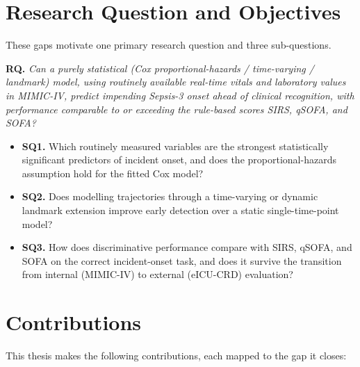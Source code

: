 \section{Research Question and Objectives}
\label{sec:rq}
These gaps motivate one primary research question and three sub-questions.

\vspace{4pt}
\noindent\textbf{RQ.} \emph{Can a purely statistical (Cox proportional-hazards /
time-varying / landmark) model, using routinely available real-time vitals and
laboratory values in MIMIC-IV, predict impending Sepsis-3 onset ahead of
clinical recognition, with performance comparable to or exceeding the rule-based
scores SIRS, qSOFA, and SOFA?}

\begin{itemize}
  \item \textbf{SQ1.} Which routinely measured variables are the strongest
  statistically significant predictors of incident onset, and does the
  proportional-hazards assumption hold for the fitted Cox model?
  \item \textbf{SQ2.} Does modelling trajectories through a time-varying or
  dynamic landmark extension improve early detection over a static
  single-time-point model?
  \item \textbf{SQ3.} How does discriminative performance compare with SIRS,
  qSOFA, and SOFA on the correct incident-onset task, and does it survive the
  transition from internal (MIMIC-IV) to external (eICU-CRD) evaluation?
\end{itemize}

\section{Contributions}
\label{sec:contrib}
This thesis makes the following contributions, each mapped to the gap it
closes:


